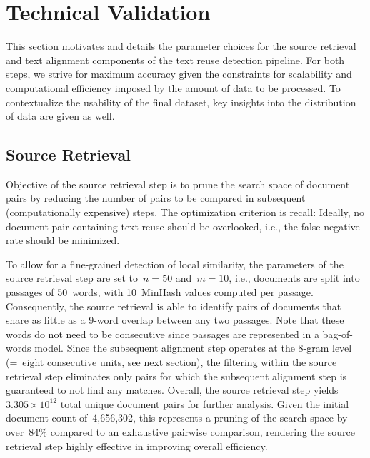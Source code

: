 \section*{Technical Validation}


This section motivates and details the parameter choices for the source retrieval and text alignment components of the text reuse detection pipeline. For both steps, we strive for maximum accuracy given the constraints for scalability and computational efficiency imposed by the amount of data to be processed. To contextualize the usability of the final dataset, key insights into the distribution of data are given as well.


\subsection*{Source Retrieval}

Objective of the source retrieval step is to prune the search space of document pairs by reducing the number of pairs to be compared in subsequent (computationally expensive) steps. The optimization criterion is recall: Ideally, no document pair containing text reuse should be overlooked, i.e., the false negative rate should be minimized.

To allow for a fine-grained detection of local similarity, the parameters of the source retrieval step are set to~$n=50$ and~$m=10$, i.e., documents are split into passages of 50~words, with 10~MinHash values computed per passage. Consequently, the source retrieval is able to identify pairs of documents that share as little as a 9-word overlap between any two passages. Note that these words do not need to be consecutive since passages are represented in a bag-of-words model. Since the subsequent alignment step operates at the 8-gram level (=~eight consecutive units, see next section), the filtering within the source retrieval step eliminates only pairs for which the subsequent alignment step is guaranteed to not find any matches. Overall, the source retrieval step yields~$3.305\times 10^{12}$ total unique document pairs for further analysis. Given the initial document count of~4,656,302, this represents a pruning of the search space by over~84\% compared to an exhaustive pairwise comparison, rendering the source retrieval step highly effective in improving overall efficiency.


